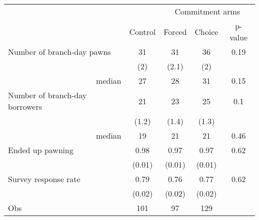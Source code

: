 \begin{tabular}{lcccc}
\toprule
      &       & \multicolumn{3}{c}{Commitment arms} \\
\cmidrule{3-5}      & Control & Forced & Choice & p-value \\
\midrule
\midrule
Number of branch-day pawns & 31    & 31    & 36    & 0.19 \\
      & (2)   & (2.1) & (2)   &  \\
\multicolumn{1}{r}{median} & 27    & 28    & 31    & 0.15 \\
\midrule
Number of branch-day borrowers & 21    & 23    & 25    & 0.1 \\
      & (1.2) & (1.4) & (1.3) &  \\
\multicolumn{1}{r}{median} & 19    & 21    & 21    & 0.46 \\
\midrule
\multicolumn{1}{p{15.82em}}{Ended up pawning} & 0.98  & 0.97  & 0.97  & 0.62 \\
      & (0.01) & (0.01) & (0.01) &  \\
Survey response rate & 0.79  & 0.76  & 0.77  & 0.62 \\
      & (0.02) & (0.02) & (0.02) &  \\
\midrule
Obs   & 101   & 97    & 129   &  \\
\bottomrule
\bottomrule
\end{tabular}%
